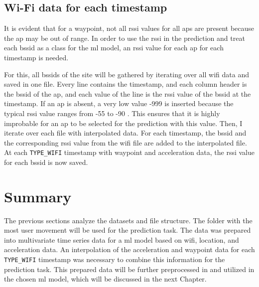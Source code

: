 \subsection{Wi-Fi data for each timestamp}\label{sec:wifi-data}
It is evident that for a waypoint, not all \ac{rssi} values for all \acp{ap} are present because the \ac{ap} may be out of range.
In order to use the \ac{rssi} in the prediction and treat each \ac{bssid} as a class for the \ac{ml} model, an \ac{rssi} value for each \ac{ap} for each timestamp is needed.

For this, all \acp{bssid} of the site will be gathered by iterating over all \ac{wifi} data and saved in one file.
Every line contains the timestamp, and each column header is the \ac{bssid} of the \ac{ap}, and each value of the line is the \ac{rssi} value of the \ac{bssid} at the timestamp.
If an \ac{ap} is absent, a very low value -999 is inserted because the typical \ac{rssi} value ranges from -55 to -90 \cite{rssi_calculation}.
This ensures that it is highly improbable for an \ac{ap} to be selected for the prediction with this value.
Then, I iterate over each file with interpolated data. For each timestamp, the \ac{bssid} and the corresponding \ac{rssi} value from the \ac{wifi} file are added to the interpolated file.
At each \texttt{TYPE\_WIFI} timestamp with waypoint and acceleration data, the \ac{rssi} value for each \ac{bssid} is now saved.

\section{Summary}
The previous sections analyze the datasets and file structure.
The folder with the most user movement will be used for the prediction task.
The data was prepared into multivariate time series data for a \ac{ml} model based on \ac{wifi}, location, and acceleration data. 
An interpolation of the acceleration and waypoint data for each \texttt{TYPE\_WIFI} timestamp was necessary to combine this information for the prediction task.
This prepared data will be further preprocessed in  and utilized in the chosen \ac{ml} model, which will be discussed in the next Chapter.
